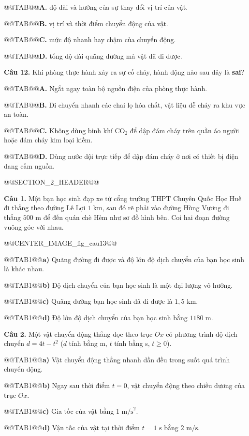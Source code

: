 \documentclass{article}
\begin{document}
@@TAB@@\textbf{A.} độ dài và hướng của sự thay đổi vị trí của vật.

@@TAB@@\textbf{B.} vị trí và thời điểm chuyển động của vật.

@@TAB@@\textbf{C.} mức độ nhanh hay chậm của chuyển động.

@@TAB@@\textbf{D.} tổng độ dài quãng đường mà vật đã đi được.

\textbf{Câu 12.} Khi phòng thực hành xảy ra sự cố cháy, hành động nào sau đây là \textbf{sai}?

@@TAB@@\textbf{A.} Ngắt ngay toàn bộ nguồn điện của phòng thực hành.

@@TAB@@\textbf{B.} Di chuyển nhanh các chai lọ hóa chất, vật liệu dễ cháy ra khu vực an toàn.

@@TAB@@\textbf{C.} Không dùng bình khí $\text{CO}_2$ để dập đám cháy trên quần áo người hoặc đám cháy kim loại kiềm.

@@TAB@@\textbf{D.} Dùng nước dội trực tiếp để dập đám cháy ở nơi có thiết bị điện đang cắm nguồn.

@@SECTION_2_HEADER@@

\textbf{Câu 1.} Một bạn học sinh đạp xe từ cổng trường THPT Chuyên Quốc Học Huế đi thẳng theo đường Lê Lợi $1\text{ km}$, sau đó rẽ phải vào đường Hùng Vương đi thẳng $500\text{ m}$ để đến quán chè Hẻm như sơ đồ hình bên. Coi hai đoạn đường vuông góc với nhau.

@@CENTER_IMAGE_fig_cau13@@

@@TAB1@@\textbf{a)} Quãng đường đi được và độ lớn độ dịch chuyển của bạn học sinh là khác nhau.

@@TAB1@@\textbf{b)} Độ dịch chuyển của bạn học sinh là một đại lượng vô hướng.

@@TAB1@@\textbf{c)} Quãng đường bạn học sinh đã đi được là $1{,}5\text{ km}$.

@@TAB1@@\textbf{d)} Độ lớn độ dịch chuyển của bạn học sinh bằng $1180\text{ m}$.

\textbf{Câu 2.} Một vật chuyển động thẳng dọc theo trục $Ox$ có phương trình độ dịch chuyển $d = 4t - t^2$ ($d$ tính bằng m, $t$ tính bằng s, $t \ge 0$).

@@TAB1@@\textbf{a)} Vật chuyển động thẳng nhanh dần đều trong suốt quá trình chuyển động.

@@TAB1@@\textbf{b)} Ngay sau thời điểm $t = 0$, vật chuyển động theo chiều dương của trục $Ox$.

@@TAB1@@\textbf{c)} Gia tốc của vật bằng $1\text{ m/s}^2$.

@@TAB1@@\textbf{d)} Vận tốc của vật tại thời điểm $t = 1\text{ s}$ bằng $2\text{ m/s}$.
\end{document}

